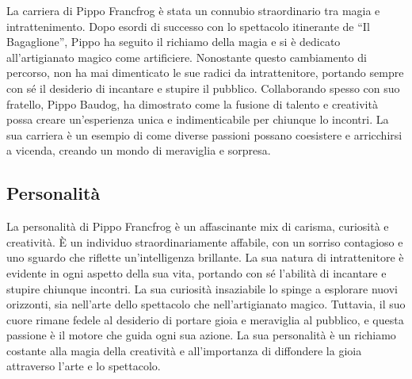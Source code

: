 La carriera di Pippo Francfrog è stata un connubio straordinario tra
magia e intrattenimento. Dopo esordi di successo con lo spettacolo
itinerante de ``Il Bagaglione'', Pippo ha seguito il richiamo della
magia e si è dedicato all'artigianato magico come artificiere.
Nonostante questo cambiamento di percorso, non ha mai dimenticato le sue
radici da intrattenitore, portando sempre con sé il desiderio di
incantare e stupire il pubblico. Collaborando spesso con suo fratello,
Pippo Baudog, ha dimostrato come la fusione di talento e creatività
possa creare un'esperienza unica e indimenticabile per chiunque lo
incontri. La sua carriera è un esempio di come diverse passioni possano
coesistere e arricchirsi a vicenda, creando un mondo di meraviglia e
sorpresa.

\subsection{Personalità}\label{personalituxe0}


La personalità di Pippo Francfrog è un affascinante mix di carisma,
curiosità e creatività. È un individuo straordinariamente affabile, con
un sorriso contagioso e uno sguardo che riflette un'intelligenza
brillante. La sua natura di intrattenitore è evidente in ogni aspetto
della sua vita, portando con sé l'abilità di incantare e stupire
chiunque incontri. La sua curiosità insaziabile lo spinge a esplorare
nuovi orizzonti, sia nell'arte dello spettacolo che nell'artigianato
magico. Tuttavia, il suo cuore rimane fedele al desiderio di portare
gioia e meraviglia al pubblico, e questa passione è il motore che guida
ogni sua azione. La sua personalità è un richiamo costante alla magia
della creatività e all'importanza di diffondere la gioia attraverso
l'arte e lo spettacolo.

